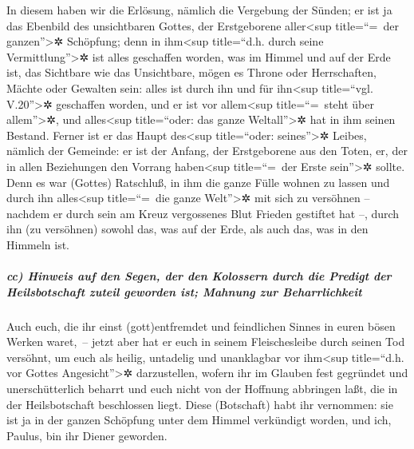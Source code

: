  In diesem haben wir die Erlösung, nämlich die Vergebung
der Sünden;  er ist ja das Ebenbild des unsichtbaren
Gottes, der Erstgeborene aller\textless sup title=``=~der
ganzen''\textgreater✲ Schöpfung;  denn in
ihm\textless sup title=``d.h. durch seine Vermittlung''\textgreater✲ ist
alles geschaffen worden, was im Himmel und auf der Erde ist, das
Sichtbare wie das Unsichtbare, mögen es Throne oder Herrschaften, Mächte
oder Gewalten sein: alles ist durch ihn und für ihn\textless sup
title=``vgl. V.20''\textgreater✲ geschaffen worden,  und
er ist vor allem\textless sup title=``=~steht über allem''\textgreater✲,
und alles\textless sup title=``oder: das ganze Weltall''\textgreater✲
hat in ihm seinen Bestand.  Ferner ist er das Haupt
des\textless sup title=``oder: seines''\textgreater✲ Leibes, nämlich der
Gemeinde: er ist der Anfang, der Erstgeborene aus den Toten, er, der in
allen Beziehungen den Vorrang haben\textless sup title=``=~der Erste
sein''\textgreater✲ sollte.  Denn es war (Gottes)
Ratschluß, in ihm die ganze Fülle wohnen zu lassen  und
durch ihn alles\textless sup title=``=~die ganze Welt''\textgreater✲ mit
sich zu versöhnen -- nachdem er durch sein am Kreuz vergossenes Blut
Frieden gestiftet hat --, durch ihn (zu versöhnen) sowohl das, was auf
der Erde, als auch das, was in den Himmeln ist.

\hypertarget{cc-hinweis-auf-den-segen-der-den-kolossern-durch-die-predigt-der-heilsbotschaft-zuteil-geworden-ist-mahnung-zur-beharrlichkeit}{%
\subparagraph{cc) Hinweis auf den Segen, der den Kolossern durch die
Predigt der Heilsbotschaft zuteil geworden ist; Mahnung zur
Beharrlichkeit}\label{cc-hinweis-auf-den-segen-der-den-kolossern-durch-die-predigt-der-heilsbotschaft-zuteil-geworden-ist-mahnung-zur-beharrlichkeit}}

 Auch euch, die ihr einst (gott)entfremdet und
feindlichen Sinnes in euren bösen Werken waret,~--  jetzt
aber hat er euch in seinem Fleischesleibe durch seinen Tod versöhnt, um
euch als heilig, untadelig und unanklagbar vor ihm\textless sup
title=``d.h. vor Gottes Angesicht''\textgreater✲ darzustellen,
 wofern ihr im Glauben fest gegründet und
unerschütterlich beharrt und euch nicht von der Hoffnung abbringen laßt,
die in der Heilsbotschaft beschlossen liegt. Diese (Botschaft) habt ihr
vernommen: sie ist ja in der ganzen Schöpfung unter dem Himmel
verkündigt worden, und ich, Paulus, bin ihr Diener geworden.

